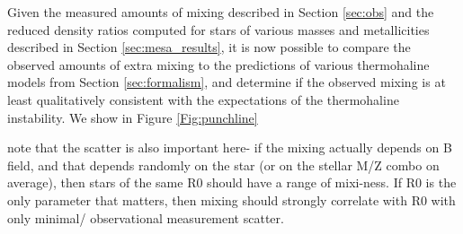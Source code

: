 

Given the measured amounts of mixing described in Section \ref{sec:obs} and the reduced density ratios computed for stars of various masses and metallicities described in Section \ref{sec:mesa_results}, it is now possible to compare the observed amounts of extra mixing to the predictions of various thermohaline models from Section \ref{sec:formalism}, and determine if the observed mixing is at least qualitatively consistent with the expectations of the thermohaline instability. We show in Figure \ref{Fig:punchline}

note that the scatter is also important here- if the mixing actually depends on B field, and that depends randomly on the star (or on the stellar M/Z combo on average), then stars of the same R0 should have a range of mixi-ness. If R0 is the only parameter that matters, then mixing should strongly correlate with R0 with only minimal/ observational measurement scatter. 

